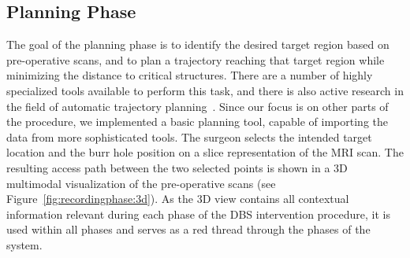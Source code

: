 \documentclass[review]{vgtc}                 %
\begin{document}
\subsection{Planning Phase}\label{sec:overview:planning}
The goal of the planning phase is to identify the desired target region based on pre-operative scans, and to plan a trajectory reaching that target region while minimizing the distance to critical structures. There are a number of highly specialized tools available to perform this task, and there is also active research in the field of automatic trajectory planning~\cite{Shamir2010}. Since our focus is on other parts of the procedure, we implemented a basic planning tool, capable of importing the data from more sophisticated tools. The surgeon selects the intended target location and the burr hole position on a slice representation of the MRI scan. The resulting access path between the two selected points is shown in a 3D multimodal visualization of the pre-operative scans (see Figure~\ref{fig:recordingphase:3d}). As the 3D view contains all contextual information relevant during each phase of the DBS intervention procedure, it is used within all phases and serves as a red thread through the phases of the system.
%
%
%
\end{document}
